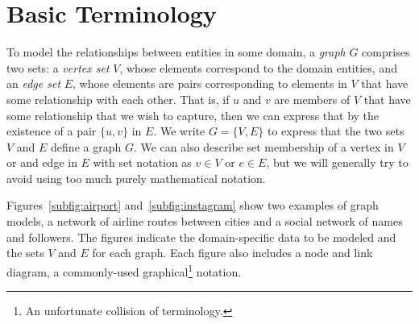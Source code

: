 \section{Basic Terminology}

To model the relationships between entities in some domain, a \emph{graph} $G$
comprises two sets: a \emph{vertex set} $V$, whose elements correspond to the domain
entities, and an \emph{edge set} $E$, whose elements are pairs corresponding to
elements in $V$ that have some relationship with each other.  That is, if $u$ and $v$
are members of $V$ that have some relationship that we wish to capture, then we can
express that by the existence of a pair $\{u, v\}$ in $E$.  We write $G=\{V, E\}$ to
express that the two sets $V$ and $E$ define a graph $G$.  We can also describe set
membership of a vertex in $V$ or and edge in $E$ with set notation as $v\in V$ or
$e\in E$, but we will generally try to avoid using too much purely mathematical
notation.

Figures~\ref{subfig:airport} and~\ref{subfig:instagram} show two examples of graph
models, a network of airline routes between cities and a social network of names and
followers.  The figures indicate the domain-specific data to be modeled and the sets
$V$ and $E$ for each graph.  Each figure also includes a node and link diagram, a
commonly-used graphical\footnote{An unfortunate collision of terminology.} notation.

